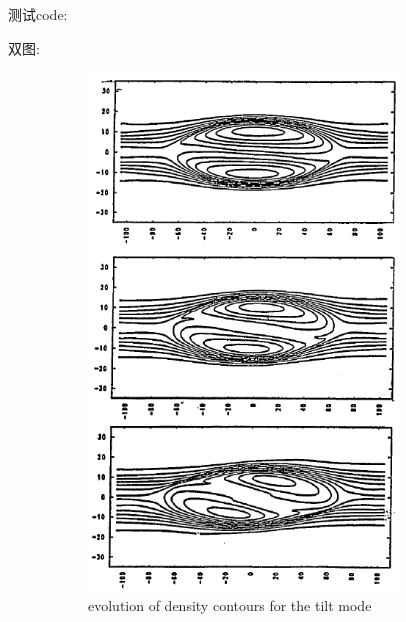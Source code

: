 测试code:



双图:
\begin{figure}[!hbtp]
    \centering
    \begin{subfigure}[b]{0.45\textwidth}
    \centering
    \includegraphics[width=0.9\textwidth]{figs/tilt.png} 
    \caption{evolution of density contours for the tilt mode}
    \label{fig: tilt}
    \end{subfigure}
    \hfill %
    \begin{subfigure}[b]{0.45\textwidth}
    \centering

\end{subfigure}
\end{figure}
